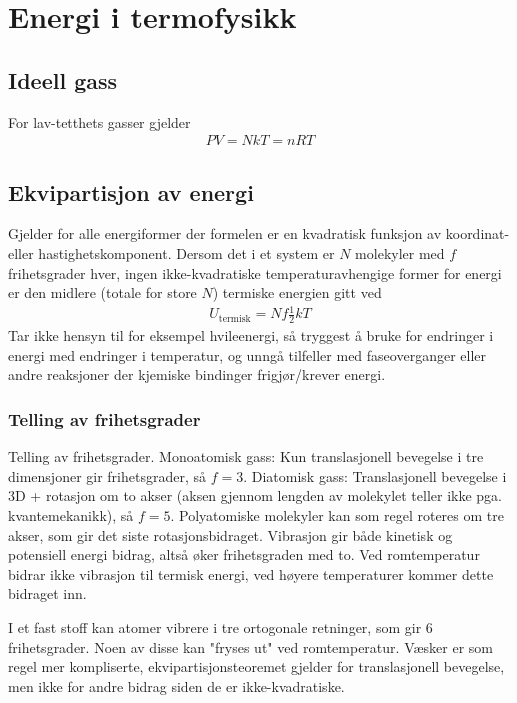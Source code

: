 \documentclass[12pt]{article}
\begin{document}
\section{Energi i termofysikk}
\subsection{Ideell gass}
For lav-tetthets gasser gjelder
\begin{align*}
  PV = NkT = nRT
\end{align*}
\subsection{Ekvipartisjon av energi}
Gjelder for alle energiformer der formelen er en kvadratisk funksjon av koordinat-
eller hastighetskomponent. Dersom det i et system er $N$ molekyler med $f$
frihetsgrader hver, ingen ikke-kvadratiske temperaturavhengige former for energi
er den midlere (totale for store $N$) termiske energien gitt ved
\begin{align*}
  U_\text{termisk} = N f \frac{1}{2}kT
\end{align*}
Tar ikke hensyn til for eksempel hvileenergi, så tryggest å bruke for endringer
i energi med endringer i temperatur, og unngå tilfeller med faseoverganger
eller andre reaksjoner der kjemiske bindinger frigjør/krever energi.

\subsubsection{Telling av frihetsgrader}
Telling av frihetsgrader. Monoatomisk gass: Kun translasjonell bevegelse i tre
dimensjoner gir frihetsgrader, så $f = 3$. Diatomisk gass: Translasjonell
bevegelse i 3D + rotasjon om to akser (aksen gjennom lengden av molekylet
teller ikke pga. kvantemekanikk), så $f = 5$. Polyatomiske molekyler kan som
regel roteres om tre akser, som gir det siste rotasjonsbidraget. Vibrasjon
gir både kinetisk og potensiell energi bidrag, altså øker frihetsgraden med to.
Ved romtemperatur bidrar ikke vibrasjon til termisk energi, ved høyere temperaturer
kommer dette bidraget inn.

I et fast stoff kan atomer vibrere i tre ortogonale retninger, som gir 6 frihetsgrader.
Noen av disse kan "fryses ut" ved romtemperatur. Væsker er som regel mer kompliserte,
ekvipartisjonsteoremet gjelder for translasjonell bevegelse, men ikke for andre
bidrag siden de er ikke-kvadratiske.
\end{document}
